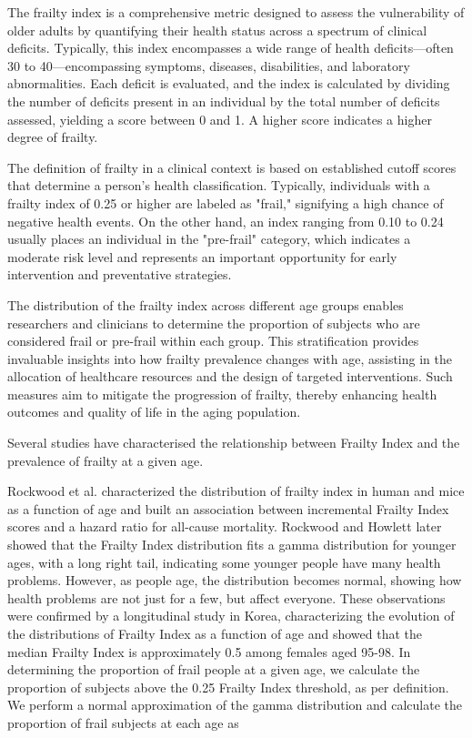 The frailty index is a comprehensive metric designed to assess the vulnerability of older adults by quantifying their health status across a spectrum of clinical deficits. Typically, this index encompasses a wide range of health deficits---often 30 to 40---encompassing symptoms, diseases, disabilities, and laboratory abnormalities. Each deficit is evaluated, and the index is calculated by dividing the number of deficits present in an individual by the total number of deficits assessed, yielding a score between 0 and 1. A higher score indicates a higher degree of frailty.

The definition of frailty in a clinical context is based on established cutoff scores that determine a person's health classification. Typically, individuals with a frailty index of 0.25 or higher are labeled as "frail," signifying a high chance of negative health events. On the other hand, an index ranging from 0.10 to 0.24 usually places an individual in the "pre-frail" category, which indicates a moderate risk level and represents an important opportunity for early intervention and preventative strategies.

The distribution of the frailty index across different age groups enables researchers and clinicians to determine the proportion of subjects who are considered frail or pre-frail within each group. This stratification provides invaluable insights into how frailty prevalence changes with age, assisting in the allocation of healthcare resources and the design of targeted interventions. Such measures aim to mitigate the progression of frailty, thereby enhancing health outcomes and quality of life in the aging population.

Several studies have characterised the relationship between Frailty Index and the prevalence of frailty at a given age.

Rockwood et al. characterized the distribution of frailty index in human and mice as a function of age and built an association between incremental Frailty Index scores and a hazard ratio for all-cause mortality\cite{Rockwood2017}. Rockwood and Howlett later showed that the Frailty Index distribution fits a gamma distribution for younger ages, with a long right tail, indicating some younger people have many health problems. However, as people age, the distribution becomes normal, showing how health problems are not just for a few, but affect everyone\cite{Rockwood2019}. These observations were confirmed by a longitudinal study in Korea, characterizing the evolution of the distributions of Frailty Index as a function of age and showed that the median Frailty Index is approximately 0.5 among females aged 95-98\cite{Baek2022}. In determining the proportion of frail people at a given age, we calculate the proportion of subjects above the 0.25 Frailty Index threshold, as per definition. We perform a normal approximation of the gamma distribution and calculate the proportion of frail subjects at each age as

